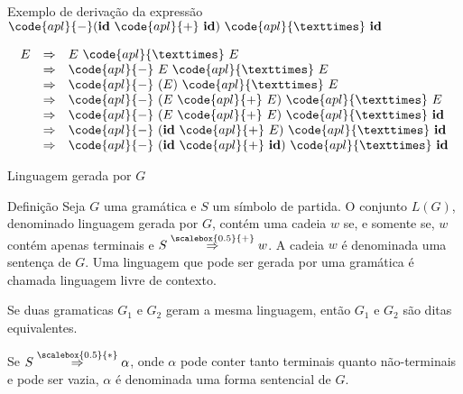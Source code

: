 \begin{frame}[fragile]{Exemplo de derivação da expressão $\code{apl}{-}(\textbf{id}\ \code{apl}{+}\ \textbf{id})\ \code{apl}{×}\ \textbf{id}$}

\[
    \begin{array}{rcl}
        E & \Rightarrow & E\ \code{apl}{×}\ E \\
          & \Rightarrow & \code{apl}{-}\ E\ \code{apl}{×}\ E\\
          & \Rightarrow & \code{apl}{-}\ (E)\ \code{apl}{×}\ E\\
          & \Rightarrow & \code{apl}{-}\ (E\ \code{apl}{+}\ E)\ \code{apl}{×}\ E\\
          & \Rightarrow & \code{apl}{-}\ (E\ \code{apl}{+}\ E)\ \code{apl}{×}\ \textbf{id}\\
          & \Rightarrow & \code{apl}{-}\ (\textbf{id}\ \code{apl}{+}\ E)\ \code{apl}{×}\ \textbf{id}\\
          & \Rightarrow & \code{apl}{-}\ (\textbf{id}\ \code{apl}{+}\ \textbf{id})\ \code{apl}{×}\ \textbf{id}
    \end{array}
\]

\end{frame}

\begin{frame}[fragile]{Linguagem gerada por $G$}

    \begin{block}{Definição}
        Seja $G$ uma gramática e $S$ um símbolo de partida. O conjunto $L(G)$, denominado linguagem gerada por $G$, contém uma cadeia $w$ se, e somente se,
            $w$ contém apenas terminais e 
            $S \overset{\scalebox{0.5}{+}}{\Rightarrow} w$. A cadeia $w$ é denominada uma sentença de $G$. Uma linguagem que pode ser gerada por uma gramática é
            chamada linguagem livre de contexto.

            \vspace{0.1in}

            Se duas gramaticas $G_1$ e $G_2$ geram a mesma linguagem, então $G_1$ e $G_2$ são ditas equivalentes.

            \vspace{0.1in}

            Se $S \overset{\scalebox{0.5}{*}}{\Rightarrow} \alpha$, onde $\alpha$ pode conter tanto terminais quanto não-terminais e pode ser vazia, $\alpha$ é denominada uma forma sentencial de $G$.
    \end{block}

\end{frame}

